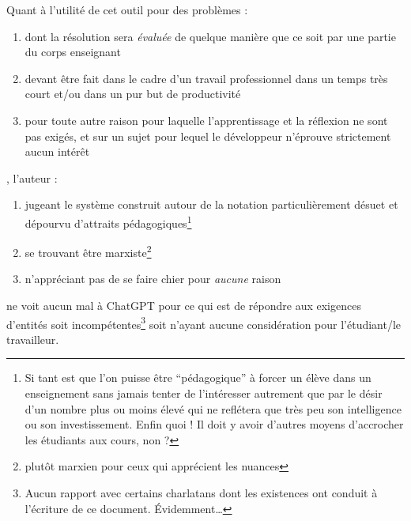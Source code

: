 \documentclass[../../../main.tex]{subfiles}
\begin{document}
Quant à l'utilité de cet outil pour des problèmes :
\begin{enumerate}
\item dont la résolution sera \textit{évaluée} de quelque manière que ce soit par une partie du corps enseignant
\item devant être fait dans le cadre d'un travail professionnel dans un temps très court et/ou dans un pur but de productivité
\item pour toute autre raison pour laquelle l'apprentissage et la réflexion ne sont pas exigés, et sur un sujet pour lequel le développeur n'éprouve strictement aucun intérêt
\end{enumerate}
, l'auteur :
\begin{enumerate}
\item jugeant le système construit autour de la notation particulièrement désuet et dépourvu d'attraits pédagogiques\footnote{Si tant est que l'on puisse être ``pédagogique'' à forcer un élève dans un enseignement sans jamais tenter de l'intéresser autrement que par le désir d'un nombre plus ou moins élevé qui ne reflétera que très peu son intelligence ou son investissement. Enfin quoi ! Il doit y avoir d'autres moyens d'accrocher les étudiants aux cours, non ?}
\item se trouvant être marxiste\footnote{plutôt marxien pour ceux qui apprécient les nuances}
\item n'appréciant pas de se faire chier pour \textit{aucune} raison
\end{enumerate}
ne voit aucun mal à ChatGPT pour ce qui est de répondre aux exigences d'entités soit incompétentes\footnote{Aucun rapport avec certains charlatans dont les existences ont conduit à l'écriture de ce document. Évidemment\dots} soit n'ayant aucune considération pour l'étudiant/le travailleur.
\end{document}

